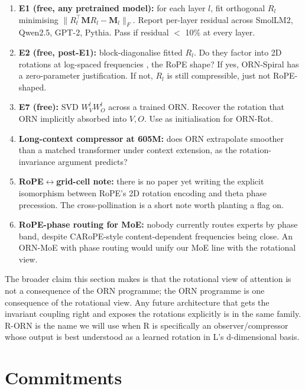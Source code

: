 \documentclass[10pt, twocolumn, a4paper]{article}
\newcommand{\M}{\mathbf{M}}
\begin{document}
\begin{enumerate}[nosep,leftmargin=1.5em]
\item \textbf{E1 (free, any pretrained model):} for each layer $l$, fit orthogonal $R_l$ minimising $\|R_l^\top \M R_l - \M_l\|_F$. Report per-layer residual across SmolLM2, Qwen2.5, GPT-2, Pythia. Pass if residual $<$ 10\% at every layer.
\item \textbf{E2 (free, post-E1):} block-diagonalise fitted $R_l$. Do they factor into 2D rotations at log-spaced frequencies ,  the RoPE shape? If yes, ORN-Spiral has a zero-parameter justification. If not, $R_l$ is still compressible, just not RoPE-shaped.
\item \textbf{E7 (free):} SVD $W_V^l W_O^l$ across a trained ORN. Recover the rotation that ORN implicitly absorbed into $V, O$. Use as initialisation for ORN-Rot.
\item \textbf{Long-context compressor at 605M:} does ORN extrapolate smoother than a matched transformer under context extension, as the rotation-invariance argument predicts?
\item \textbf{RoPE$\leftrightarrow$grid-cell note:} there is no paper yet writing the explicit isomorphism between RoPE's 2D rotation encoding and theta phase precession. The cross-pollination is a short note worth planting a flag on.
\item \textbf{RoPE-phase routing for MoE:} nobody currently routes experts by phase band, despite CARoPE-style content-dependent frequencies being close. An ORN-MoE with phase routing would unify our MoE line with the rotational view.
\end{enumerate}

The broader claim this section makes is that the rotational view of attention is not a consequence of the ORN programme; the ORN programme is one consequence of the rotational view. Any future architecture that gets the invariant coupling right and exposes the rotations explicitly is in the same family. R-ORN is the name we will use when R is specifically an observer/compressor whose output is best understood as a learned rotation in L's d-dimensional basis.


\section{Commitments}
\end{document}
